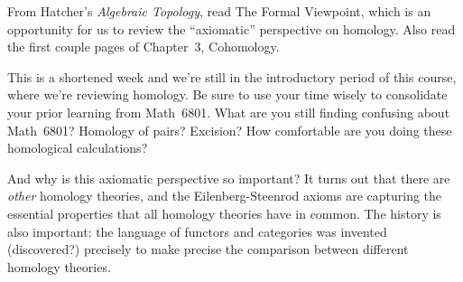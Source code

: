 \documentclass{homework}
\author{Jim Fowler}
\date{Week 2: Homology and coefficients}
\begin{document}
\maketitle

From Hatcher's \textit{Algebraic Topology}, read  The
Formal Viewpoint, which is an opportunity for us to review the
``axiomatic'' perspective on homology.  Also read the first couple
pages of Chapter~3, Cohomology.

This is a shortened week and we're still in the introductory period of
this course, where we're reviewing homology.  Be sure to use your time
wisely to consolidate your prior learning from Math~6801.  What are
you still finding confusing about Math~6801?  Homology of pairs?
Excision?  How comfortable are you doing these homological
calculations?

And why is this axiomatic perspective so important?  It turns out that
there are \textit{other} homology theories, and the Eilenberg-Steenrod
axioms are capturing the essential properties that all homology
theories have in common.  The history is also important: the language
of functors and categories was invented (discovered?) precisely to
make precise the comparison between different homology theories.
\end{document}
